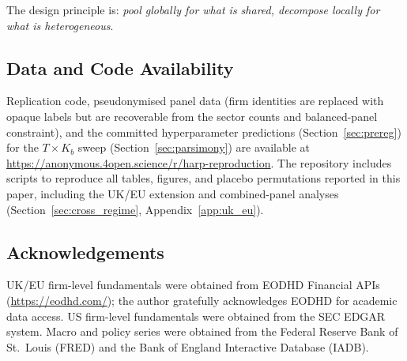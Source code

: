 \documentclass[11pt,a4paper]{article}
\begin{document}
The design principle is: \emph{pool globally for what is shared, decompose locally for what is heterogeneous}.


\subsection*{Data and Code Availability}

Replication code, pseudonymised panel data (firm identities are replaced with opaque labels but are recoverable from the sector counts and balanced-panel constraint), and the committed hyperparameter predictions (Section~\ref{sec:prereg}) for the $T \times K_b$ sweep (Section~\ref{sec:parsimony}) are available at \url{https://anonymous.4open.science/r/harp-reproduction}. The repository includes scripts to reproduce all tables, figures, and placebo permutations reported in this paper, including the UK/EU extension and combined-panel analyses (Section~\ref{sec:cross_regime}, Appendix~\ref{app:uk_eu}).

\subsection*{Acknowledgements}

UK/EU firm-level fundamentals were obtained from EODHD Financial APIs (\url{https://eodhd.com/}); the author gratefully acknowledges EODHD for academic data access. US firm-level fundamentals were obtained from the SEC EDGAR system. Macro and policy series were obtained from the Federal Reserve Bank of St.\ Louis (FRED) and the Bank of England Interactive Database (IADB).

\end{document}
